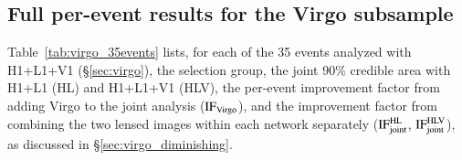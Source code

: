 \documentclass{aa}
\begin{document}
\begin{appendix}







\onecolumn
\section{Full per-event results for the Virgo subsample}
\label{app:virgo_table}

Table~\ref{tab:virgo_35events} lists, for each of the 35 events analyzed
with H1+L1+V1 (\S\ref{sec:virgo}), the selection group, the joint 90\%
credible area with H1+L1 (HL) and H1+L1+V1 (HLV), the per-event improvement
factor from adding Virgo to the joint analysis ($\mathrm{IF}_{\rm Virgo}$),
and the improvement factor from combining the two lensed images within each
network separately ($\mathrm{IF}_{\rm joint}^{\rm HL}$,
$\mathrm{IF}_{\rm joint}^{\rm HLV}$), as discussed in
\S\ref{sec:virgo_diminishing}.




\end{appendix}
\end{document}
